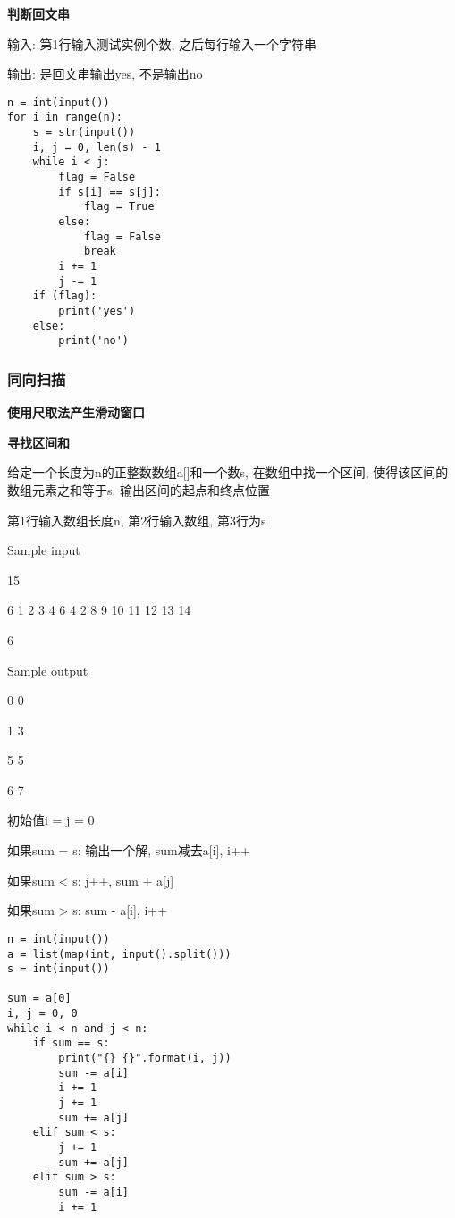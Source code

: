 \documentclass[../main]{subfiles}
\begin{document}
\begin{sloppy}
\newpage
\textbf{判断回文串}

输入: 第1行输入测试实例个数, 之后每行输入一个字符串

输出: 是回文串输出yes, 不是输出no

\begin{lstlisting}[style = Python]
n = int(input())
for i in range(n):
    s = str(input())
    i, j = 0, len(s) - 1
    while i < j:
        flag = False
        if s[i] == s[j]:
            flag = True
        else:
            flag = False
            break
        i += 1
        j -= 1
    if (flag):
        print('yes')
    else:
        print('no')
\end{lstlisting}

\subsubsection{同向扫描}

\textbf{使用尺取法产生滑动窗口}

\textbf{寻找区间和}

给定一个长度为n的正整数数组a[]和一个数s, 在数组中找一个区间, 使得该区间的数组元素之和等于s. 输出区间的起点和终点位置

第1行输入数组长度n, 第2行输入数组, 第3行为s

Sample input

15

6 1 2 3 4 6 4 2 8 9 10 11 12 13 14

6

Sample output

0 0

1 3

5 5

6 7

初始值i = j = 0

如果sum = s: 输出一个解, sum减去a[i], i++

如果sum < s: j++, sum + a[j]

如果sum > s: sum - a[i], i++

\newpage
\begin{lstlisting}[style = Python]
n = int(input())
a = list(map(int, input().split()))
s = int(input())

sum = a[0]
i, j = 0, 0
while i < n and j < n:
    if sum == s:
        print("{} {}".format(i, j))
        sum -= a[i]
        i += 1
        j += 1
        sum += a[j]
    elif sum < s:
        j += 1
        sum += a[j]
    elif sum > s:
        sum -= a[i]
        i += 1
\end{lstlisting}


\end{sloppy}
\end{document}
